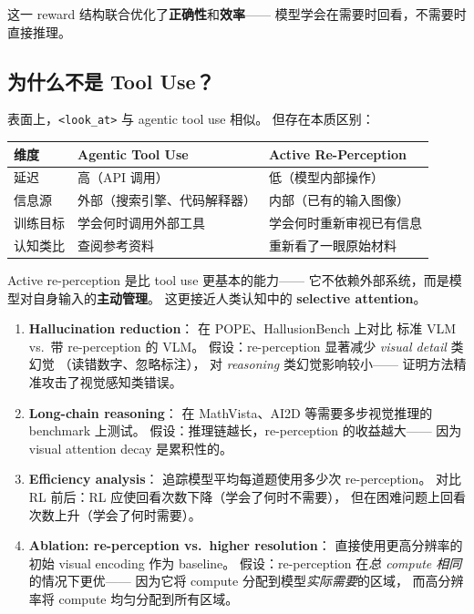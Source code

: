 \documentclass[12pt,a4paper]{article}
\begin{document}
\noindent
这一 reward 结构联合优化了\textbf{正确性}和\textbf{效率}——
模型学会在需要时回看，不需要时直接推理。

\subsection{为什么不是 Tool Use？}

表面上，\texttt{<look\_at>} 与 agentic tool use 相似。
但存在本质区别：

\begin{table}[h]
\centering
\small
\begin{tabular}{lll}
\toprule
\textbf{维度} & \textbf{Agentic Tool Use} & \textbf{Active Re-Perception} \\
\midrule
延迟 & 高（API 调用） & 低（模型内部操作） \\
信息源 & 外部（搜索引擎、代码解释器） & 内部（已有的输入图像） \\
训练目标 & 学会何时调用外部工具 & 学会何时重新审视已有信息 \\
认知类比 & 查阅参考资料 & 重新看了一眼原始材料 \\
\bottomrule
\end{tabular}
\end{table}

\noindent
Active re-perception 是比 tool use 更基本的能力——
它不依赖外部系统，而是模型对自身输入的\textbf{主动管理}。
这更接近人类认知中的 \textbf{selective attention}。

\begin{expbox}
\begin{enumerate}[leftmargin=1.5em]
  \item \textbf{Hallucination reduction}：
    在 POPE、HallusionBench 上对比
    标准 VLM vs.\ 带 re-perception 的 VLM。
    假设：re-perception 显著减少 \textit{visual detail} 类幻觉
    （读错数字、忽略标注），
    对 \textit{reasoning} 类幻觉影响较小——
    证明方法精准攻击了视觉感知类错误。

  \item \textbf{Long-chain reasoning}：
    在 MathVista、AI2D 等需要多步视觉推理的 benchmark 上测试。
    假设：推理链越长，re-perception 的收益越大——
    因为 visual attention decay 是累积性的。

  \item \textbf{Efficiency analysis}：
    追踪模型平均每道题使用多少次 re-perception。
    对比 RL 前后：RL 应使回看次数下降（学会了何时不需要），
    但在困难问题上回看次数上升（学会了何时需要）。

  \item \textbf{Ablation: re-perception vs.\ higher resolution}：
    直接使用更高分辨率的初始 visual encoding 作为 baseline。
    假设：re-perception 在\textit{总 compute 相同}的情况下更优——
    因为它将 compute 分配到模型\textit{实际需要}的区域，
    而高分辨率将 compute 均匀分配到所有区域。
\end{enumerate}
\end{expbox}
\end{document}
